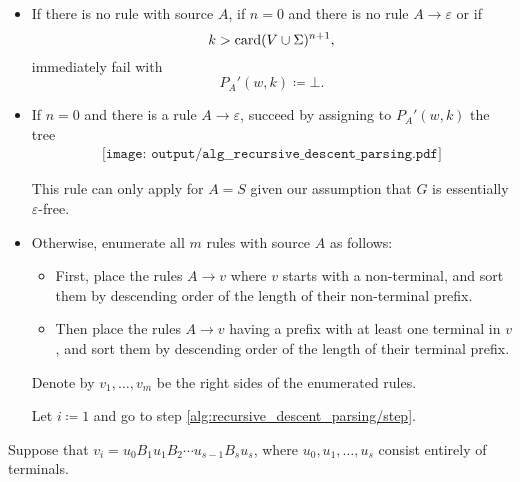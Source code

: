\begin{algorithm}
  \begin{thmenum}
    \begin{itemize}
      \item If there is no rule with source \( A \), if \( n = 0 \) and there is no rule \( A \to \varepsilon \) or if
      \begin{equation*}
        k > \operatorname{card}(V \cup \Sigma)^{n+1},
      \end{equation*}
      immediately fail with
      \begin{equation*}
        P_A'(w, k) \coloneqq \bot.
      \end{equation*}

      \item If \( n = 0 \) and there is a rule \( A \to \varepsilon \), succeed by assigning to \( P_A'(w, k) \) the tree
      \begin{equation*}
        \begin{aligned}
          \texttt{[image: output/alg\_\_recursive\_descent\_parsing.pdf]}
        \end{aligned}
      \end{equation*}

      This rule can only apply for \( A = S \) given our assumption that \( G \) is essentially \( \varepsilon \)-free.

      \item Otherwise, enumerate all \( m \) rules with source \( A \) as follows:
      \begin{itemize}
        \item First, place the rules \( A \to v \) where \( v \) starts with a non-terminal, and sort them by descending order of the length of their non-terminal prefix.

        \item Then place the rules \( A \to v \) having a prefix with at least one terminal in \( v \), and sort them by descending order of the length of their terminal prefix.
      \end{itemize}

      Denote by \( v_1, \ldots, v_m \) be the right sides of the enumerated rules.

      Let \( i \coloneqq 1 \) and go to step \ref{alg:recursive_descent_parsing/step}.
    \end{itemize}

     Suppose that \( v_i = u_0 B_1 u_1 B_2 \cdots u_{s-1} B_s u_s \), where \( u_0, u_1, \ldots, u_s \) consist entirely of terminals.


\end{thmenum}
\end{algorithm}
